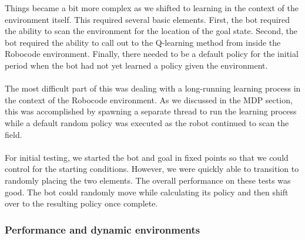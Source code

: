 \documentclass{aiaa-tc}%
\begin{document}
Things became a bit more complex as we shifted to
learning in the context of the environment itself. This required
several basic elements. First, the bot required the ability to scan
the environment for the location of the goal state. Second, the bot
required the ability to call out to the Q-learning method from inside
the Robocode environment. Finally, there needed to be a default policy
for the initial period when the bot had not yet learned a policy given
the environment.  \\ \\
The most difficult part of this was dealing with a long-running
learning process in the context of the Robocode environment. As we
discussed in the MDP section, this was accomplished by spawning a
separate thread to run the learning process while a default random
policy was executed as the robot continued to scan the field. \\ \\
For initial testing, we started the bot and goal in fixed points so
that we could control for the starting conditions. However, we were
quickly able to transition to randomly placing the two elements. The overall
performance on these tests was good. The bot could randomly move while
calculating its policy and then shift over to the resulting policy
once complete.
\subsubsection{Performance and dynamic environments}
\end{document}
